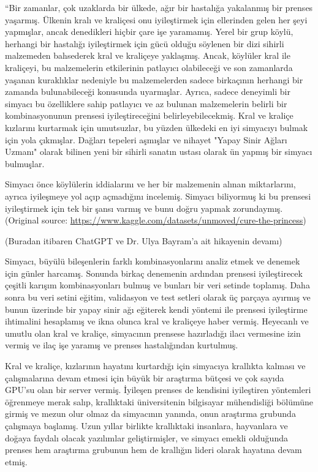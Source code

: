 \documentclass[11pt]{article}
\begin{document}
``Bir zamanlar, çok uzaklarda bir ülkede, ağır bir hastalığa yakalanmış bir prenses yaşarmış. Ülkenin kralı ve kraliçesi onu iyileştirmek için ellerinden gelen her şeyi yapmışlar, ancak denedikleri hiçbir çare işe yaramamış.
Yerel bir grup köylü, herhangi bir hastalığı iyileştirmek için gücü olduğu söylenen bir dizi sihirli malzemeden bahsederek kral ve kraliçeye yaklaşmış. Ancak, köylüler kral ile kraliçeyi, bu malzemelerin etkilerinin patlayıcı olabileceği ve son zamanlarda yaşanan kuraklıklar nedeniyle bu malzemelerden sadece birkaçının herhangi bir zamanda bulunabileceği konusunda uyarmışlar. Ayrıca, sadece deneyimli bir simyacı bu özelliklere sahip patlayıcı ve az bulunan malzemelerin belirli bir kombinasyonunun prensesi iyileştireceğini belirleyebilecekmiş.
Kral ve kraliçe kızlarını kurtarmak için umutsuzlar, bu yüzden ülkedeki en iyi simyacıyı bulmak için yola çıkmışlar. Dağları tepeleri aşmışlar ve nihayet "Yapay Sinir Ağları Uzmanı" olarak bilinen yeni bir sihirli sanatın ustası olarak ün yapmış bir simyacı bulmuşlar.

Simyacı önce köylülerin iddialarını ve her bir malzemenin alınan miktarlarını, ayrıca iyileşmeye yol açıp açmadığını incelemiş. Simyacı biliyormuş ki bu prensesi iyileştirmek için tek bir şansı varmış ve bunu doğru yapmak zorundaymış. (Original source: \url{https://www.kaggle.com/datasets/unmoved/cure-the-princess})

(Buradan itibaren ChatGPT ve Dr. Ulya Bayram'a ait hikayenin devamı)

Simyacı, büyülü bileşenlerin farklı kombinasyonlarını analiz etmek ve denemek için günler harcamış. Sonunda birkaç denemenin ardından prensesi iyileştirecek çeşitli karışım kombinasyonları bulmuş ve bunları bir veri setinde toplamış. Daha sonra bu veri setini eğitim, validasyon ve test setleri olarak üç parçaya ayırmış ve bunun üzerinde bir yapay sinir ağı eğiterek kendi yöntemi ile prensesi iyileştirme ihtimalini hesaplamış ve ikna olunca kral ve kraliçeye haber vermiş. Heyecanlı ve umutlu olan kral ve kraliçe, simyacının prensese hazırladığı ilacı vermesine izin vermiş ve ilaç işe yaramış ve prenses hastalığından kurtulmuş.

Kral ve kraliçe, kızlarının hayatını kurtardığı için simyacıya krallıkta kalması ve çalışmalarına devam etmesi için büyük bir araştırma bütçesi ve çok sayıda GPU'su olan bir server vermiş. İyileşen prenses de kendisini iyileştiren yöntemleri öğrenmeye merak salıp, krallıktaki üniversitenin bilgisayar mühendisliği bölümüne girmiş ve mezun olur olmaz da simyacının yanında, onun araştırma grubunda çalışmaya başlamış. Uzun yıllar birlikte krallıktaki insanlara, hayvanlara ve doğaya faydalı olacak yazılımlar geliştirmişler, ve simyacı emekli olduğunda prenses hem araştırma grubunun hem de krallığın lideri olarak hayatına devam etmiş.
\end{document}
